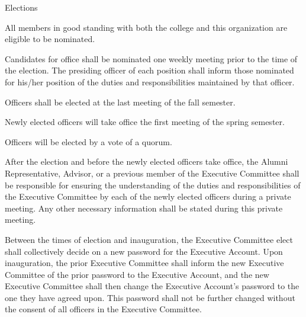 {
\begin{article}{Elections}
	\item All members in good standing with both the college and this organization are eligible to be nominated.
	\item Candidates for office shall be nominated one weekly meeting prior to the time of the election. The presiding officer of each position shall inform those nominated for his/her position of the duties and responsibilities maintained by that officer.
	\item Officers shall be elected at the last meeting of the fall semester.
	\item Newly elected officers will take office the first meeting of the spring semester.
	\item Officers will be elected by a vote of a quorum.
	\item After the election and before the newly elected officers take office, the Alumni Representative, Advisor, or a previous member of the Executive Committee shall be responsible for ensuring the understanding of the duties and responsibilities of the Executive Committee by each of the newly elected officers during a private meeting. Any other necessary information shall be stated during this private meeting.
	\item Between the times of election and inauguration, the Executive Committee elect shall collectively decide on a new password for the Executive Account. Upon inauguration, the prior Executive Committee shall inform the new Executive Committee of the prior password to the Executive Account, and the new Executive Committee shall then change the Executive Account’s password to the one they have agreed upon. This password shall not be further changed without the consent of all officers in the Executive Committee.
\end{article}
}